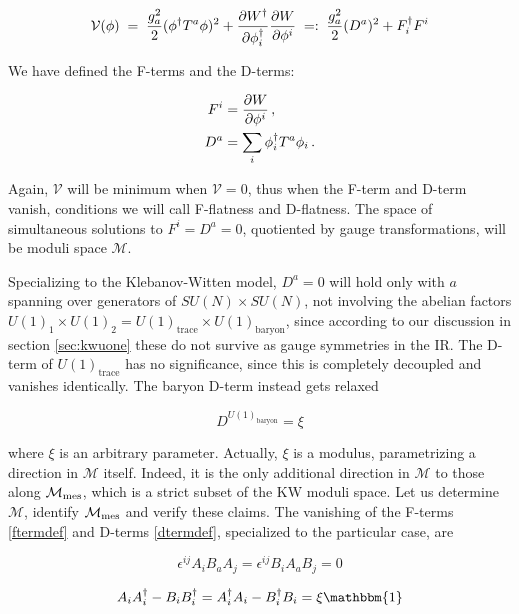 \begin{equation}
	\mathcal{V}(\phi) \;=\; \frac{g_a^2}{2} (\phi^\dagger T^a \phi)^2 + \frac{\partial W^\dagger}{\partial\phi^\dagger_i} \frac{\partial W}{\partial\phi^i} \; =:\; \frac{g_a^2}{2} (D^a)^2 + F^\dagger_i F^i
	\label{effpotential}
\end{equation}

We have defined the F-terms and the D-terms:

\begin{align}
	F^i &= \frac{\partial W}{\partial\phi^i}\,,\label{ftermdef}\\
	D^a &= \sum_i \phi_i^\dagger T^a \phi_i\,.\label{dtermdef}
\end{align}

Again, $\mathcal{V}$ will be minimum when $\mathcal{V}=0$, thus when the F-term and D-term vanish, conditions we will call F-flatness and D-flatness. The space of simultaneous solutions to $F^i = D^a = 0$, quotiented by gauge transformations, will be moduli space $\mathcal{M}$.

Specializing to the Klebanov-Witten model, $D^a = 0$ will hold only with $a$ spanning over generators of $SU(N) \times SU(N)$, not involving the abelian factors $U(1)_1\times U(1)_2 = U(1)_\text{trace} \times U(1)_\text{baryon}$, since according to our discussion in section \ref{sec:kwuone} these do not survive as gauge symmetries in the IR. The D-term of $U(1)_\text{trace}$ has no significance, since this is completely decoupled and vanishes identically. The baryon D-term instead gets relaxed

\begin{equation}
	D^{U(1)_\text{baryon}} = \xi
	\label{}
\end{equation}

where $\xi$ is an arbitrary parameter. Actually, $\xi$ is a modulus, parametrizing a direction in $\mathcal{M}$ itself. Indeed, it is the only additional direction in $\mathcal{M}$ to those along $\mathcal{M}_\mathrm{mes}$, which is a strict subset of the KW moduli space. Let us determine $\mathcal{M}$, identify $\mathcal{M}_\mathrm{mes}$ and verify these claims. The vanishing of the F-terms \eqref{ftermdef} and D-terms \eqref{dtermdef}, specialized to the particular case, are

\begin{equation}
	\epsilon^{ij} A_i B_a A_j = \epsilon^{ij} B_i A_a B_j = 0
	\label{}
\end{equation}

\begin{equation}
	A_i A_i^\dagger - B_i B_i^\dagger = A^\dagger_i A_i - B^\dagger_i B_i = \xi \mathbbm{1}
	\label{}
\end{equation}

